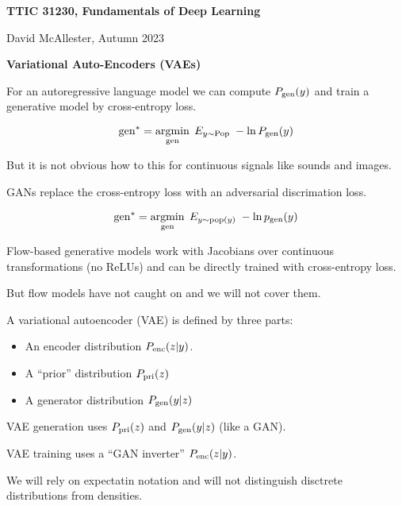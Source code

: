




{\Huge

  \centerline{\bf TTIC 31230, Fundamentals of Deep Learning}
  \bigskip
  \centerline{David McAllester, Autumn 2023}
  \vfill
  \vfill
  \centerline{\bf Variational Auto-Encoders (VAEs)}
  \vfill
  \vfill


For an autoregressive language model we can compute $P_{\mathrm{gen}}(y)$
and train a generative model by cross-entropy loss.

$$\mathrm{gen}^* = \operatorname*{argmin}_{\mathrm{gen}} \;E_{y \sim \mathrm{Pop}}\;-\ln P_{\mathrm{gen}}(y)$$

\vfill
But it is not obvious how to this for continuous signals like sounds and images.

\vfill
GANs replace the cross-entropy loss with an adversarial discrimation loss.

$$\mathrm{gen}^* = \operatorname*{argmin}_{\mathrm{gen}} \;E_{y \sim \mathrm{pop}(y)}\;-\ln p_{\mathrm{gen}}(y)$$

\vfill
Flow-based generative models work with Jacobians over continuous transformations (no ReLUs)
and can be directly trained with cross-entropy loss.

\vfill
But flow models have not caught on and we will not cover them.

A variational autoencoder (VAE) is defined by three parts:

\vfill
\begin{itemize}
\item An encoder distribution $P_{\mathrm{enc}}(z|y)$.

\vfill
\item A ``prior'' distribution $P_{\mathrm{pri}}(z)$

\vfill
\item A generator distribution $P_{\mathrm{gen}}(y|z)$
\end{itemize}

\vfill
VAE generation uses $P_{\mathrm{pri}}(z)$ and $P_{\mathrm{gen}}(y|z)$ (like a GAN).

\vfill
VAE training uses a ``GAN inverter'' $P_{\mathrm{enc}}(z|y)$.

\vfill
We will rely on expectatin notation and will not distinguish disctrete distributions from densities.


}
